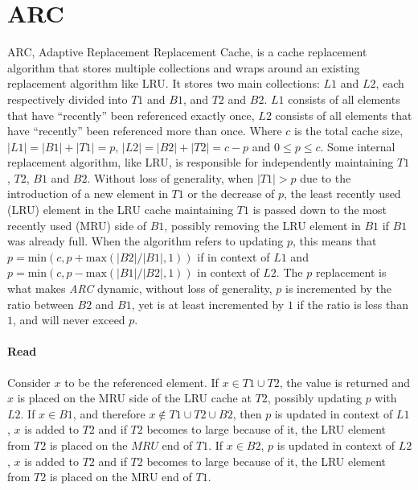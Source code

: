 \documentclass[pdftex,a4paper,12pt,twoside]{report}
\begin{document}
\section{ARC}
ARC, Adaptive Replacement Replacement Cache, is a cache replacement algorithm that stores multiple collections and wraps around an existing replacement algorithm like LRU. It stores two main collections: $L1$ and $L2$, each respectively divided into $T1$ and $B1$, and $T2$ and $B2$. $L1$ consists of all elements that have ``recently'' been referenced exactly once, $L2$ consists of all elements that have ``recently'' been referenced more than once. Where $c$ is the total cache size, $\left\vert{L1}\right\vert = \left\vert{B1}\right\vert + \left\vert{T1}\right\vert = p$, $\left\vert{L2}\right\vert = \left\vert{B2}\right\vert + \left\vert{T2}\right\vert = c - p$ and $0 \le p \le c$. Some internal replacement algorithm, like LRU, is responsible for independently maintaining $T1$, $T2$, $B1$ and $B2$. Without loss of generality, when $\left\vert{T1}\right\vert > p$ due to the introduction of a new element in $T1$ or the decrease of $p$, the least recently used (LRU) element in the LRU cache maintaining $T1$ is passed down to the most recently used (MRU) side of $B1$, possibly removing the LRU element in $B1$ if $B1$ was already full.
When the algorithm refers to updating $p$, this means that $p = \text{min}(c, p + \text{max}(\left\vert{B2}\right\vert/\left\vert{B1}\right\vert, 1))$ if in context of $L1$ and $p = \text{min}(c, p - \text{max}(\left\vert{B1}\right\vert/\left\vert{B2}\right\vert, 1))$ in context of $L2$. The $p$ replacement is what makes \emph{ARC} dynamic, without loss of generality, $p$ is incremented by the ratio between $B2$ and $B1$, yet is at least incremented by $1$ if the ratio is less than $1$, and will never exceed $p$.

\paragraph{Read} Consider $x$ to be the referenced element. If $x \in T1 \cup T2$, the value is returned and $x$ is placed on the MRU side of the LRU cache at $T2$, possibly updating $p$ with $L2$. If $x \in B1$, and therefore $x \not \in T1 \cup T2 \cup B2$, then $p$ is updated in context of $L1$, $x$ is added to $T2$ and if $T2$ becomes to large because of it, the LRU element from $T2$ is placed on the $MRU$ end of $T1$. If $x \in B2$, $p$ is updated in context of $L2$, $x$ is added to $T2$ and if $T2$ becomes to large because of it, the LRU element from $T2$ is placed on the MRU end of $T1$.
\end{document}
